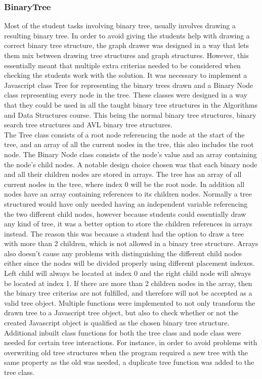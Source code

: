 \subsubsection{BinaryTree}
Most of the student tasks involving binary tree, usually involves drawing a resulting binary tree. In order to avoid giving the students help with drawing a correct binary tree structure, the graph drawer was designed in a way that lets them mix between drawing tree structures and graph structures. However, this essentially meant that multiple extra criterias  needed to be considered when checking the students work with the solution. It was necessary to implement a Javascript class Tree for representing the binary trees drawn and a Binary Node class representing every node in the tree. These classes were designed in a way that they could be used in all the taught binary tree structures in the Algorithms and Data Structures course. This being the normal binary tree structures, binary search tree structures and AVL binary tree structures. 
\\[11pt]
The Tree class consists of a root node referencing the node at the start of the tree, and an array of all the current nodes in the tree, this also includes the root node. The Binary Node class consists of the node's value and an array containing the node's child nodes. A notable design choice chosen was that each binary node and all their children nodes are stored in arrays. The tree has an array of all current nodes in the tree, where index 0 will be the root node. In addition all nodes have an array containing references to its children nodes. Normally a tree structured would have only needed having an independent variable referencing the two different child nodes, however because students could essentially draw any kind of tree, it was a better option to store the children references in arrays instead. The reason this was because a student had the option to draw a tree with more than 2 children, which is not allowed in a binary tree structure. Arrays also doesn't cause any problems with distinguishing the different child nodes either since the nodes will be divided properly using different placement indexes. Left child will always be located at index 0 and the right child node will always be located at index 1. If there are more than 2 children nodes in the array, then the binary tree criterias are not fulfilled, and therefore will not be accepted as a valid tree object. Multiple functions were implemented to not only transform the drawn tree to a Javascript tree object, but also to check whether or not the created Javascript object is qualified as the chosen binary tree structure. Additional inbuilt class functions for both the tree class and node class were needed for certain tree interactions. For instance, in order to avoid problems with overwriting old tree structures when the program required a new tree with the same property as the old was needed, a duplicate tree function was added to the tree class.\\[11pt]
